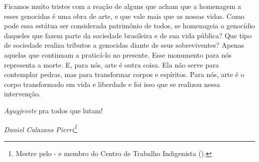Ficamos muito tristes com a reação de alguns que acham que a homenagem a
esses genocidas é uma obra de arte, e que vale mais que as nossas
vidas. Como pode essa estátua ser considerada patrimônio de todos, se
homenageia o genocídio daqueles que fazem parte da sociedade brasileira
e de sua vida pública? Que tipo de sociedade realiza tributos a
genocidas diante de seus sobreviventes? Apenas aquelas que continuam a
praticá-lo no presente. Esse monumento para nós representa a morte. E,
para nós, arte é outra coisa. Ela não serve para contemplar pedras,
mas para transformar corpos e espíritos. Para nós, arte é o corpo
transformado em vida e liberdade e foi isso que se realizou nessa
intervenção.

\emph{Aguyjevete} pra todos que lutam!

\begin{flushright}
\emph{Daniel Calazans Pierri\footnote{Mestre pelo - e membro do
Centro de Trabalho Indigenista ().}}
\end{flushright}
\bigskip

